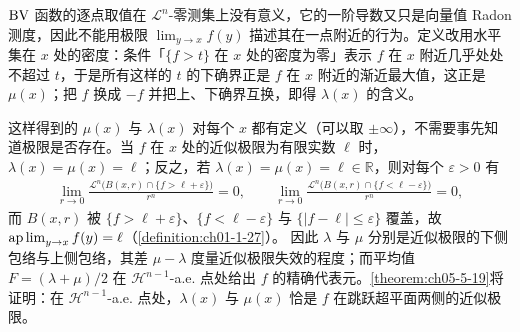 \documentclass[../../main.tex]{subfiles}%
\begin{document}
\begin{remark}\label{remark:ch05-def-5-8-动机}
$\mathrm{BV}$ 函数的逐点取值在 $\mathcal{L}^n$-零测集上没有意义，它的一阶导数又只是向量值 Radon 测度，因此不能用极限 $\lim_{y\to x}f(y)$ 描述其在一点附近的行为。定义改用水平集在 $x$ 处的密度：条件「$\{f>t\}$ 在 $x$ 处的密度为零」表示 $f$ 在 $x$ 附近几乎处处不超过 $t$，于是所有这样的 $t$ 的下确界正是 $f$ 在 $x$ 附近的渐近最大值，这正是 $\mu(x)$；把 $f$ 换成 $-f$ 并把上、下确界互换，即得 $\lambda(x)$ 的含义。

这样得到的 $\mu(x)$ 与 $\lambda(x)$ 对每个 $x$ 都有定义（可以取 $\pm\infty$），不需要事先知道极限是否存在。当 $f$ 在 $x$ 处的近似极限为有限实数 $\ell$ 时，$\lambda(x)=\mu(x)=\ell$；反之，若 $\lambda(x)=\mu(x)=\ell\in\mathbb{R}$，则对每个 $\varepsilon>0$ 有
\begin{align*}
\lim_{r\to0}\frac{\mathcal{L}^n\bigl(B(x,r)\cap\{f>\ell+\varepsilon\}\bigr)}{r^n}=0,\qquad
\lim_{r\to0}\frac{\mathcal{L}^n\bigl(B(x,r)\cap\{f<\ell-\varepsilon\}\bigr)}{r^n}=0,
\end{align*}
而 $B(x,r)$ 被 $\{f>\ell+\varepsilon\}$、$\{f<\ell-\varepsilon\}$ 与 $\{\lvert f-\ell\rvert\leqslant\varepsilon\}$ 覆盖，故 $\operatorname*{ap\,lim}_{y\to x}f(y)=\ell$（\cref{definition:ch01-1-27}）。%
因此 $\lambda$ 与 $\mu$ 分别是近似极限的下侧包络与上侧包络，其差 $\mu-\lambda$ 度量近似极限失效的程度；而平均值 $F=(\lambda+\mu)/2$ 在 $\mathcal{H}^{n-1}$-a.e. 点处给出 $f$ 的精确代表元。\cref{theorem:ch05-5-19}将证明：在 $\mathcal{H}^{n-1}$-a.e. 点处，$\lambda(x)$ 与 $\mu(x)$ 恰是 $f$ 在跳跃超平面两侧的近似极限。%
\end{remark}
\end{document}
